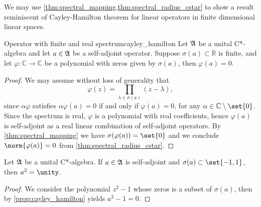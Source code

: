 We may use \cref{thm:spectral_mapping,thm:spectral_radius_cstar} to show a result reminiscent of Cayley-Hamilton theorem for linear operators in finite dimensional linear spaces.
\begin{proposition}{Operator with finite and real spectrum}{cayley_hamilton}
    Let \(\mathfrak{A}\) be a unital C*-algebra and let \(a \in \mathfrak{A}\) be a self-adjoint operator. Suppose \(\sigma(a) \subset \mathbb{R}\) is finite, and let \(\varphi : \mathbb{C} \to \mathbb{C}\) be a polynomial with zeros given by \(\sigma(a)\), then \(\varphi(a) = 0\).
\end{proposition}
\begin{proof}
    We may assume without loss of generality that
    \begin{equation*}
        \varphi(z) = \prod_{\lambda \in \sigma(a)} (z - \lambda),
    \end{equation*}
    since \(\alpha \varphi\) satisfies \(\alpha \varphi(a) = 0\) if and only if \(\varphi(a) = 0\), for any \(\alpha \in \mathbb{C}\setminus \set{0}\). Since the spectrum is real, \(\varphi\) is a polynomial with real coefficients, hence \(\varphi(a)\) is self-adjoint as a real linear combination of self-adjoint operators. By \cref{thm:spectral_mapping} we have \(\sigma(\varphi(a)) = \set{0}\) and we conclude \(\norm{\varphi(a)} = 0\) from \cref{thm:spectral_radius_cstar}.
\end{proof}
\begin{corollary}
    Let \(\mathfrak{A}\) be a unital C*-algebra. If \(a \in \mathfrak{A}\) is self-adjoint and \(\sigma(a) \subset \set{-1,1}\), then \(a^2 = \unity\).
\end{corollary}
\begin{proof}
    We consider the polynomial \(z^2 - 1\) whose zeros is a subset of \(\sigma(a)\), then by \cref{prop:cayley_hamilton} yields \(a^2 - 1 = 0\).
\end{proof}

